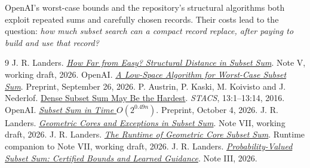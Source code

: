 \documentclass[11pt,english]{article}
\begin{document}
OpenAI's worst-case bounds and the repository's structural algorithms both
exploit repeated sums and carefully chosen records. Their costs lead to the question:
\emph{how much subset search can a compact record replace, after paying to
build and use that record?}

\begingroup\footnotesize
\begin{thebibliography}{9}
\setlength{\itemsep}{1pt}\setlength{\parskip}{0pt}
 J. R. Landers. \href{../notes/05-structural-distance/Structural_Distance_in_Subset_Sum.pdf}{\emph{How Far from Easy? Structural Distance in Subset Sum}}. Note V, working draft, 2026.
 OpenAI. \href{https://github.com/openai/math/blob/7ef5c0cc5ca4b0e072b7a050fca09ab24bc6fa3a/preprints/A-Low-Space-Algorithm-for-Worst-Case-Subset-Sum-September-26-2026/paper.pdf}{\emph{A Low-Space Algorithm for Worst-Case Subset Sum}}. Preprint, September 26, 2026.
 P. Austrin, P. Kaski, M. Koivisto and J. Nederlof. \href{https://doi.org/10.4230/LIPIcs.STACS.2016.13}{Dense Subset Sum May Be the Hardest}. \emph{STACS}, 13:1--13:14, 2016.
 OpenAI. \href{https://github.com/openai/math/blob/7ef5c0cc5ca4b0e072b7a050fca09ab24bc6fa3a/preprints/Subset-Sum-in-Time-2-power-0-49n-October-4-2026/subset-sum.pdf}{\emph{Subset Sum in Time $O(2^{0.49n})$}}. Preprint, October 4, 2026.
 J. R. Landers. \href{../notes/07-geometric-cores/Geometric_Cores_and_Exceptions_in_Subset_Sum.pdf}{\emph{Geometric Cores and Exceptions in Subset Sum}}. Note VII, working draft, 2026.
 J. R. Landers. \href{../notes/07-geometric-cores/Runtime_of_Geometric_Core_Subset_Sum.pdf}{\emph{The Runtime of Geometric Core Subset Sum}}. Runtime companion to Note VII, working draft, 2026.
 J. R. Landers. \href{../notes/03-probability-valued-subset-sum/Probability_Valued_Subset_Sum.pdf}{\emph{Probability-Valued Subset Sum: Certified Bounds and Learned Guidance}}. Note III, 2026.
\end{thebibliography}
\endgroup
\end{document}
